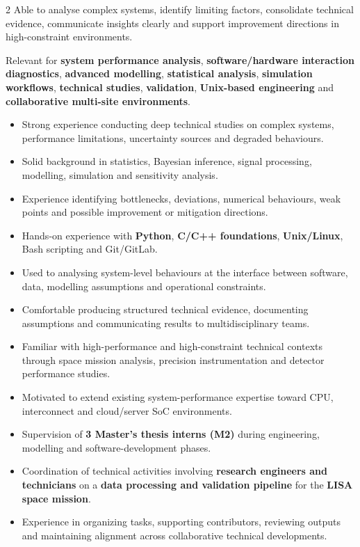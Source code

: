 \documentclass[8pt,a4paper,ragged2e,withhyper]{altacv}
\begin{document}
\begin{paracol}{2}
Able to analyse complex systems, identify limiting factors, consolidate technical evidence, communicate insights clearly and support improvement directions in high-constraint environments.

Relevant for \textbf{system performance analysis}, \textbf{software/hardware interaction diagnostics}, \textbf{advanced modelling}, \textbf{statistical analysis}, \textbf{simulation workflows}, \textbf{technical studies}, \textbf{validation}, \textbf{Unix-based engineering} and \textbf{collaborative multi-site environments}.


\begin{itemize}
  \item Strong experience conducting deep technical studies on complex systems, performance limitations, uncertainty sources and degraded behaviours.
  \item Solid background in statistics, Bayesian inference, signal processing, modelling, simulation and sensitivity analysis.
  \item Experience identifying bottlenecks, deviations, numerical behaviours, weak points and possible improvement or mitigation directions.
  \item Hands-on experience with \textbf{Python}, \textbf{C/C++ foundations}, \textbf{Unix/Linux}, Bash scripting and Git/GitLab.
  \item Used to analysing system-level behaviours at the interface between software, data, modelling assumptions and operational constraints.
  \item Comfortable producing structured technical evidence, documenting assumptions and communicating results to multidisciplinary teams.
  \item Familiar with high-performance and high-constraint technical contexts through space mission analysis, precision instrumentation and detector performance studies.
  \item Motivated to extend existing system-performance expertise toward CPU, interconnect and cloud/server SoC environments.
\end{itemize}


\begin{itemize}
  \item Supervision of \textbf{3 Master's thesis interns (M2)} during engineering, modelling and software-development phases.
  \item Coordination of technical activities involving \textbf{research engineers and technicians} on a \textbf{data processing and validation pipeline} for the \textbf{LISA space mission}.
  \item Experience in organizing tasks, supporting contributors, reviewing outputs and maintaining alignment across collaborative technical developments.
\end{itemize}


\end{paracol}
\end{document}
